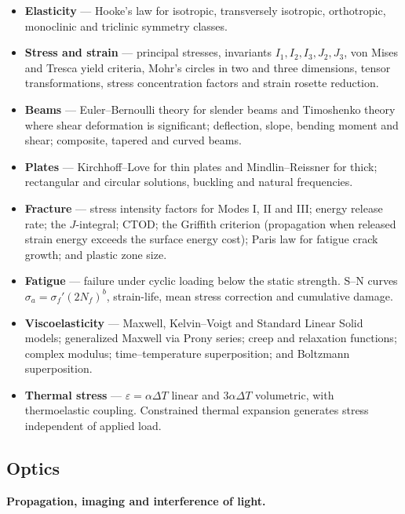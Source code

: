 \documentclass[11pt,a4paper]{article}
\begin{document}
\begin{itemize}[leftmargin=1.4em,itemsep=0.35em]
  \item \textbf{Elasticity} --- Hooke's law for isotropic, transversely isotropic, orthotropic,
        monoclinic and triclinic symmetry classes.
  \item \textbf{Stress and strain} --- principal stresses, invariants $I_1, I_2, I_3, J_2, J_3$, von
        Mises and Tresca yield criteria, Mohr's circles in two and three dimensions, tensor
        transformations, stress concentration factors and strain rosette reduction.
  \item \textbf{Beams} --- Euler--Bernoulli theory for slender beams and Timoshenko theory where
        shear deformation is significant; deflection, slope, bending moment and shear; composite,
        tapered and curved beams.
  \item \textbf{Plates} --- Kirchhoff--Love for thin plates and Mindlin--Reissner for thick;
        rectangular and circular solutions, buckling and natural frequencies.
  \item \textbf{Fracture} --- stress intensity factors for Modes I, II and III; energy release rate;
        the $J$-integral; CTOD; the Griffith criterion (propagation when released strain energy
        exceeds the surface energy cost); Paris law for fatigue crack growth; and plastic zone size.
  \item \textbf{Fatigue} --- failure under cyclic loading below the static strength. S--N curves
        $\sigma_a = \sigma_f'(2N_f)^b$, strain-life, mean stress correction and cumulative damage.
  \item \textbf{Viscoelasticity} --- Maxwell, Kelvin--Voigt and Standard Linear Solid models;
        generalized Maxwell via Prony series; creep and relaxation functions; complex modulus;
        time--temperature superposition; and Boltzmann superposition.
  \item \textbf{Thermal stress} --- $\varepsilon = \alpha\Delta T$ linear and $3\alpha\Delta T$
        volumetric, with thermoelastic coupling. Constrained thermal expansion generates stress
        independent of applied load.
\end{itemize}

\subsection{Optics}

\textbf{Propagation, imaging and interference of light.}
\end{document}
